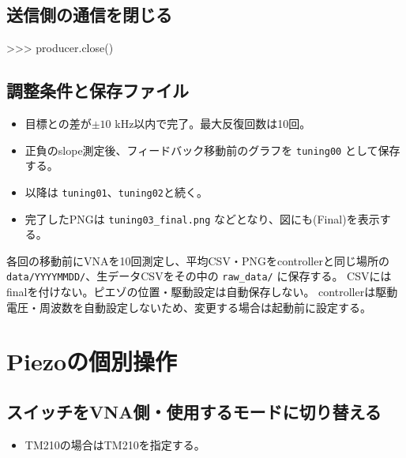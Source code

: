 \documentclass[a4paper,11pt]{ltjsarticle}
\begin{document}
\subsection{送信側の通信を閉じる}

\begin{command}

>>> producer.close()

\end{command}

\subsection{調整条件と保存ファイル}

\begin{itemize}
\item 目標との差が$\pm10$ kHz以内で完了。最大反復回数は10回。
\item 正負のslope測定後、フィードバック移動前のグラフを \texttt{tuning00} として保存する。
\item 以降は \texttt{tuning01}、\texttt{tuning02}と続く。
\item 完了したPNGは \texttt{tuning03\_final.png} などとなり、図にも(Final)を表示する。
\end{itemize}

各回の移動前にVNAを10回測定し、平均CSV・PNGをcontrollerと同じ場所の
\texttt{data/YYYYMMDD/}、生データCSVをその中の \texttt{raw\_data/} に保存する。
CSVにはfinalを付けない。ピエゾの位置・駆動設定は自動保存しない。
controllerは駆動電圧・周波数を自動設定しないため、変更する場合は起動前に設定する。

\section{Piezoの個別操作}

\subsection{スイッチをVNA側・使用するモードに切り替える}

\begin{command}


\end{command}

\begin{itemize}

\item TM210の場合はTM210を指定する。

\end{itemize}
\end{document}
